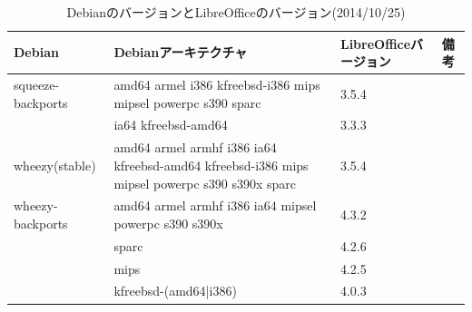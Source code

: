 \documentclass[mingoth,a4paper]{jsarticle}
\begin{document}
\begin{table}[ht!]
\begin{center}
  {\small{
      \begin{tabular}{|l|p{7cm}|l|l|}
        \hline
        Debian&Debianアーキテクチャ&LibreOfficeバージョン& 備考\\ \hline \hline
        squeeze-backports & amd64 armel i386 kfreebsd-i386 mips mipsel powerpc s390 sparc & 3.5.4 & \\ \cline{2-4}
              & ia64 kfreebsd-amd64 & 3.3.3 & \\ \hline
        wheezy(stable) & amd64 armel armhf i386 ia64 kfreebsd-amd64 kfreebsd-i386 mips mipsel powerpc s390 s390x sparc & 3.5.4 & \\ \hline
        wheezy-backports & amd64 armel armhf i386 ia64 mipsel powerpc s390 s390x & 4.3.2 & \\ \cline{2-4}
              & sparc & 4.2.6 & \\ \cline{2-4}
              & mips & 4.2.5  & \\ \cline{2-4}
              & kfreebsd-(amd64|i386)& 4.0.3 & \\ \hline
      \end{tabular}
    }}
\end{center}
\caption{DebianのバージョンとLibreOfficeのバージョン(2014/10/25)}
\label{tab:debian-vs-libreoffice-version}
\end{table}
\end{document}
